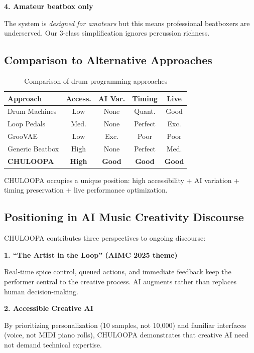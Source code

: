 \documentclass{aimc2026}
\begin{document}
\textbf{4. Amateur beatbox only}

The system is \emph{designed for amateurs} but this means professional beatboxers are underserved. Our 3-class simplification ignores percussion richness.

\subsection{Comparison to Alternative Approaches}

\begin{table}[h]
  \caption{Comparison of drum programming approaches}
  \label{tab:comparison}
  \centering
  \small
  \begin{tabular}{lcccc}
    \toprule
    Approach & Access. & AI Var. & Timing & Live \\
    \midrule
    Drum Machines & Low & None & Quant. & Good \\
    Loop Pedals & Med. & None & Perfect & Exc. \\
    GrooVAE & Low & Exc. & Poor & Poor \\
    Generic Beatbox & High & None & Perfect & Med. \\
    \textbf{CHULOOPA} & \textbf{High} & \textbf{Good} & \textbf{Good} & \textbf{Good} \\
    \bottomrule
  \end{tabular}
\end{table}

CHULOOPA occupies a unique position: high accessibility + AI variation + timing preservation + live performance optimization.

\subsection{Positioning in AI Music Creativity Discourse}

CHULOOPA contributes three perspectives to ongoing discourse:

\textbf{1. ``The Artist in the Loop'' (AIMC 2025 theme)}

Real-time spice control, queued actions, and immediate feedback keep the performer central to the creative process. AI augments rather than replaces human decision-making.

\textbf{2. Accessible Creative AI}

By prioritizing personalization (10 samples, not 10,000) and familiar interfaces (voice, not MIDI piano rolls), CHULOOPA demonstrates that creative AI need not demand technical expertise.
\end{document}
